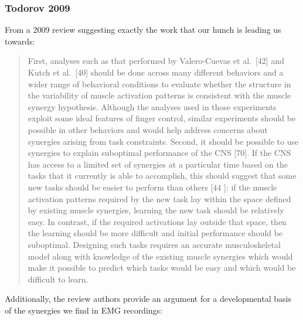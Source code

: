 {            \hypertarget{todorov-2009}{%
            \subsubsection{Todorov 2009}\label{todorov-2009}}

            From a 2009 review suggesting exactly the work that our
            hunch is leading us towards:

            \begin{quote}
            First, analyses such as that performed by Valero-Cuevas et
            al.~{[}42{]} and Kutch et al.~{[}40{]} should be done across
            many different behaviors and a wider range of behavioral
            conditions to evaluate whether the structure in the
            variability of muscle activation patterns is consistent with
            the muscle synergy hypothesis. Although the analyses used in
            those experiments exploit some ideal features of finger
            control, similar experiments should be possible in other
            behaviors and would help address concerns about synergies
            arising from task constraints. Second, it should be possible
            to use synergies to explain suboptimal performance of the
            CNS {[}70{]}. If the CNS has access to a limited set of
            synergies at a particular time based on the tasks that it
            currently is able to accomplish, this should suggest that
            some new tasks should be easier to perform than others {[}44
            {]}: if the muscle activation patterns required by the new
            task lay within the space defined by existing muscle
            synergies, learning the new task should be relatively easy.
            In contrast, if the required activations lay outside that
            space, then the learning should be more difficult and
            initial performance should be suboptimal. Designing such
            tasks requires an accurate musculoskeletal model along with
            knowledge of the existing muscle synergies which would make
            it possible to predict which tasks would be easy and which
            would be difficult to learn.
            \end{quote}

            Additionally, the review authors provide an argument for a
            developmental basis of the synergies we find in EMG
            recordings:

}
